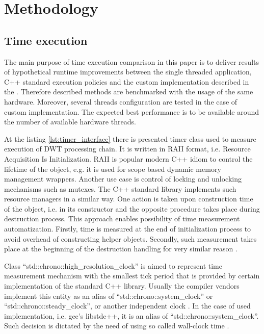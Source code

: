 \section{Methodology}

\subsection{Time execution}

The main purpose of time execution comparison in this paper is to deliver results of hypothetical runtime
improvements between the single threaded application, C++ standard execution policies and the custom
implementation described in the . Therefore described methods are
benchmarked with the usage of the same hardware. Moreover, several threads configuration are tested
in the case of custom implementation. The expected best performance is to be available around
the number of available hardware threads.

At the listing \ref{lst:timer_interface} there is presented timer class used to measure execution of DWT
processing chain. It is written in RAII format, i.e. Resource Acquisition Is Initialization. RAII is 
popular modern C++ idiom to control the lifetime of the object, e.g. it is used for scope based
dynamic memory management wrappers. Another use case is control of locking and unlocking mechanisms such
as mutexes. The C++ standard library implements such resource managers in a similar way. One action
is taken upon construction time of the object, i.e. in its constructor and the opposite procedure
takes place during destruction process. This approach enables possibility of time measurement automatization.
Firstly, time is measured at the end of initialization process to avoid overhead of constructing helper
objects. Secondly, such measurement takes place at the beginning of the destruction handling for
very similar reason \cite{cppreference}.

Class ``std::chrono::high\_resolution\_clock'' is aimed to represent time measurement mechanism with the
smallest tick period that is provided by certain implementation of the standard C++ library. Usually
the compiler vendors implement this entity as an alias of ``std::chrono::system\_clock'' or
``std::chrono::steady\_clock'', or another independent clock \cite{cppreference}. In the case of used implementation,
i.e. gcc's libstdc++, it is an alias of ``std::chrono::system\_clock''. Such decision is dictated by
the need of using so called wall-clock time \cite{cppreference}.

